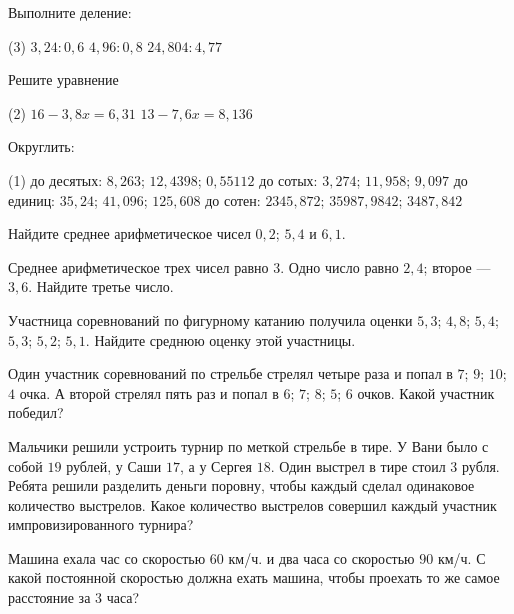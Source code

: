 %
%

\begin{class}[number=1]
	\begin{listofex}
		\item Выполните деление:\begin{tasks}(3)
			\task \( 3,24:0,6 \)
			\task \( 4,96 : 0,8 \)
			\task \( 24,804 : 4,77 \)
		\end{tasks}
		\item Решите уравнение \begin{tasks}(2)
			\task \( 16-3,8x = 6,31 \)
			\task \( 13 -7,6x = 8,136 \)
		\end{tasks} 
		\item Округлить:
		\begin{tasks}(1)
			\task до десятых: \( 8,263 \);   \( 12,4398 \);    \( 0,55112 \)
			\task до сотых: \( 3,274 \);   \( 11,958 \);   \( 9,097 \)
			\task до единиц: \( 35,24 \);   \( 41,096 \);   \( 125,608 \)
			\task до сотен: \( 2345,872 \);   \( 35987,9842 \);   \( 3487,842 \)
		\end{tasks} 
		\item Найдите среднее арифметическое чисел \( 0,2 \); \( 5,4 \) и \( 6,1 \).
		\item Среднее арифметическое трех чисел равно 3. Одно число равно \( 2,4 \); второе --- \( 3,6 \). Найдите третье число.
		\item Участница соревнований по фигурному катанию получила оценки \( 5,3 \); \( 4,8 \); \( 5,4 \); \(  5,3 \);  \( 5,2 \); \(  5,1 \). Найдите среднюю оценку этой участницы.                                                                                                                                            
		\item Один участник соревнований по стрельбе стрелял четыре раза и попал в \( 7 \); \( 9 \); \( 10 \); \( 4 \) очка. А второй стрелял пять раз и попал в \( 6 \); \( 7 \); \( 8 \); \( 5 \); \( 6 \) очков. Какой участник победил?    
		\item Мальчики решили устроить турнир по меткой стрельбе в тире. У Вани было с собой \( 19 \) рублей, у Саши \( 17 \), а у Сергея \( 18 \). Один выстрел в тире стоил \( 3 \) рубля. Ребята решили разделить деньги поровну, чтобы каждый сделал одинаковое количество выстрелов. Какое количество выстрелов совершил каждый участник импровизированного турнира? 
		\item Машина ехала час со скоростью 60 км/ч. и два часа со скоростью \( 90 \) км/ч. С какой постоянной скоростью должна ехать машина, чтобы проехать то же самое расстояние за \( 3 \) часа? 

\end{listofex}
\end{class}
